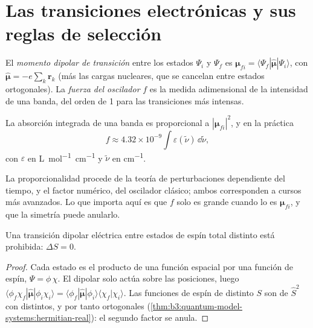 \section{Las transiciones electrónicas y sus reglas de selección}

\begin{definition}\label{def:b3:electronic-spectroscopy:transition-dipole}
El \emph{momento dipolar de transición} entre
los estados $\Psi_i$ y $\Psi_f$ es $\boldsymbol\mu_{fi} = \langle\Psi_f|\hat{\boldsymbol\mu}|\Psi_i
\rangle$, con $\hat{\boldsymbol\mu} = -e\sum_k\mathbf r_k$ (más las cargas
nucleares, que se cancelan entre estados ortogonales). La \emph{fuerza del
oscilador} $f$ es la medida adimensional de la
intensidad de una banda, del orden de 1 para las transiciones más intensas.
\end{definition}

\begin{proposition}\label{prop:b3:electronic-spectroscopy:intensity}
La absorción integrada de una banda es proporcional a $|\boldsymbol\mu_{fi}|^2$,
y en la práctica
\[
f \approx 4.32\times10^{-9}\int\varepsilon(\tilde\nu)\,\dd\tilde\nu,
\]
con $\varepsilon$ en \unit{L.mol^{-1}.cm^{-1}} y $\tilde\nu$ en \unit{cm^{-1}}.
\end{proposition}
\admitted

La proporcionalidad procede de la teoría de perturbaciones dependiente del tiempo, y el
factor numérico, del oscilador clásico; ambos corresponden a cursos más
avanzados. Lo que importa aquí es que $f$ solo es grande cuando lo es
$\boldsymbol\mu_{fi}$, y que la simetría puede anularlo.

\begin{theorem}\label{thm:b3:electronic-spectroscopy:spin-rule}
Una transición dipolar eléctrica entre estados de espín total distinto está
prohibida: $\Delta S = 0$.
\end{theorem}

\begin{proof}
Cada estado es el producto de una función espacial por una función de espín, $\Psi = \phi\,\chi$.
El  dipolar solo actúa sobre las posiciones, luego $\langle\phi_f\chi_f|\hat{\boldsymbol\mu}|
\phi_i\chi_i\rangle = \langle\phi_f|\hat{\boldsymbol\mu}|\phi_i\rangle\langle\chi_f|\chi_i\rangle$.
Las funciones de espín de distinto $S$ son  de $\hat S^2$ con 
distintos, y por tanto ortogonales (\cref{thm:b3:quantum-model-systems:hermitian-real}):
el segundo factor se anula.
\end{proof}


